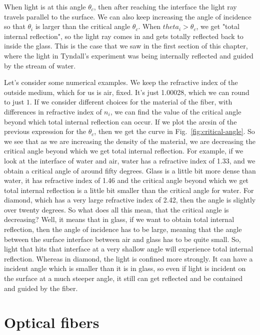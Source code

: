 When light is at this angle $\theta_c$, then after reaching the interface the light ray travels parallel to the surface. We  can also keep increasing the angle of incidence so that $\theta_i$ is larger than the critical angle $\theta_c$.  When $theta_i > \theta_c$, we get "total internal reflection", so the light ray comes in and gets totally reflected back to inside the glass. This is the case that we saw in the first section of this chapter, where the light in Tyndall's experiment was being internally reflected and guided by the stream of water.

Let's consider some numerical examples. We keep the refractive index of the outside medium, which for us is air, fixed. It's just 1.00028, which we can round to just $1$. If we consider different choices for the material of the fiber, with differences in refractive index of $n_i$, we can find the value of the critical angle beyond which total internal reflection can occur. If we plot the arcsin of the previous expression for the $\theta_c$, then we get the curve in Fig.~\ref{fig:critical-angle}. So we see that as we are increasing the density  of the material, we are decreasing the critical angle beyond which we get total internal reflection. For example, if we look at the interface of water and air, water has a refractive index of 1.33, and we obtain a critical angle of around fifty degrees. Glass is a little bit more dense than water, it has refractive index of 1.46 and the critical angle beyond which we get total internal reflection is a little bit smaller than the critical angle for water. For diamond, which has a very large refractive index of 2.42, then the angle is slightly over twenty degrees. So what does all this mean, that the critical angle is decreasing? Well, it means that in glass, if we want to obtain total internal reflection, then the angle of incidence has to be large, meaning that the angle between the surface interface between air and glass has to be quite small.  So, light that hits that interface at a very shallow angle will experience total internal reflection. Whereas in diamond, the light is confined more strongly. It can have a incident angle which is smaller than it is in glass, so even if light is incident on the surface at a much steeper angle, it still can get reflected and be contained and guided by the fiber.



\section{Optical fibers}

